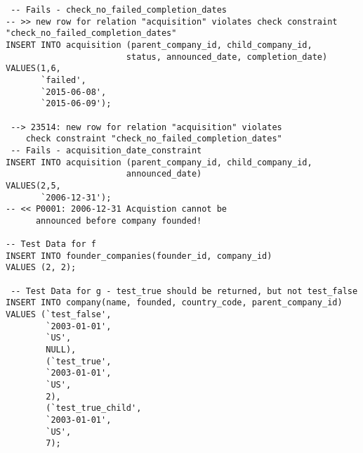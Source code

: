 \documentclass[12pt]{article}
\begin{document}
\begin{verbatim}
 -- Fails - check_no_failed_completion_dates
-- >> new row for relation "acquisition" violates check constraint
"check_no_failed_completion_dates"
INSERT INTO acquisition (parent_company_id, child_company_id,
                        status, announced_date, completion_date)
VALUES(1,6,
       `failed',
       `2015-06-08',
       `2015-06-09');

 --> 23514: new row for relation "acquisition" violates
    check constraint "check_no_failed_completion_dates"
 -- Fails - acquisition_date_constraint
INSERT INTO acquisition (parent_company_id, child_company_id,
                        announced_date)
VALUES(2,5,
       `2006-12-31');
-- << P0001: 2006-12-31 Acquistion cannot be
      announced before company founded!

-- Test Data for f
INSERT INTO founder_companies(founder_id, company_id)
VALUES (2, 2);

 -- Test Data for g - test_true should be returned, but not test_false
INSERT INTO company(name, founded, country_code, parent_company_id)
VALUES (`test_false',
        `2003-01-01',
        `US',
        NULL),
        (`test_true',
        `2003-01-01',
        `US',
        2),
        (`test_true_child',
        `2003-01-01',
        `US',
        7);



\end{verbatim}
\end{document}
